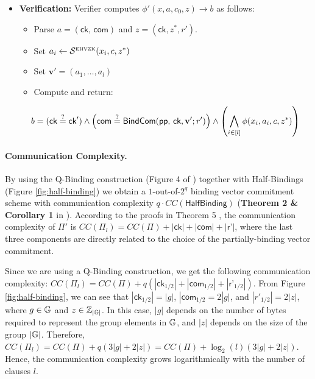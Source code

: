 \begin{protocol}[label={prot:stacksig-compiler}]
\begin{itemize}
\begin{itemize}
        \end{itemize}
      \item \textbf{Verification:} Verifier computes $\phi'(x,a,c_0,z) \rightarrow b$ as follows:
      \begin{itemize}
        \item Parse $a = (\textsf{ck, com})$ and $z = (\textsf{ck}, z^*, r')$.
        \item Set $a_i \leftarrow \mathcal S^{\text{\tiny EHVZK}}(x_i, c, z^*)$
        \item Set $\mathbf{v}' = (a_1, \ldots, a_l)$
        \item Compute and return: 
      \end{itemize}
      \[
          b = (\textsf{ck} \overset {?} {=} \textsf{ck}') \land \left(\textsf{com} \overset {?} {=} \textsf{BindCom}(\textsf{pp, ck}, \mathbf{v}'; r')\right) \land 
          \left(\bigwedge_{i \in [l]} \phi(x_i, a_i, c,z^*)\right)
        \]
  \end{itemize}
\end{protocol}

\paragraph{Communication Complexity.} By using the Q-Binding construction (Figure 4 of \cite{StackingSigmas}) together with Half-Bindings 
(Figure \ref{fig:half-binding}) we obtain a $1$-out-of-$2^q$ 
binding vector commitment scheme with communication complexity $q \cdot CC(\textsf{HalfBinding})$ 
(\textbf{Theorem 2 \& Corollary 1} in \cite{StackingSigmas}). According to the proofs in Theorem 5 \cite{StackingSigmas}, the communication complexity of 
$\Pi'$ is 
$CC(\Pi_l) = CC(\Pi) + |\textsf{ck}| + |\textsf{com}| + |\textsf{r'}|$, where the last three components are directly related to the choice of the 
partially-binding vector commitment. 

Since we are using a Q-Binding construction, we get the following communication complexity: 
$CC(\Pi_l) = CC(\Pi) + q(|\textsf{ck}_{1/2}| + |\textsf{com}_{1/2}| + |\textsf{r'}_{1/2}|)$. From Figure \ref{fig:half-binding}, we can see that 
$|\textsf{ck}_{1/2}| = |g|$, $|\textsf{com}_{1/2} = 2|g|$, and $|r'_{1/2}| = 2|z|$, where $g \in \mathbb{G}$ and $z \in \mathbb{Z}_{|\mathbb{G}|}$. In this case, $|g|$ 
depends on the number of bytes required to represent the group elements in $\mathbb{G}$, and $|z|$ depends on the size of the group $|\mathbb{G}|$. Therefore, 
$CC(\Pi_l) = CC(\Pi) + q(3|g| + 2|z|) = CC(\Pi) + \log_2(l)(3|g| + 2|z|)$. Hence, the communication complexity grows logarithmically with the 
number of clauses $l$.